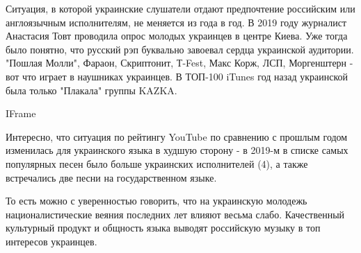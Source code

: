 Ситуация, в которой украинские слушатели отдают предпочтение российским
или англоязычным исполнителям, не меняется из года в год. В 2019 году
журналист Анастасия Товт проводила опрос молодых украинцев в центре Киева.
Уже тогда было понятно, что русский рэп буквально завоевал сердца
украинской аудитории. "Пошлая Молли", Фараон, Скриптонит, Т-Fest, Макс
Корж, ЛСП, Моргенштерн - вот что играет в наушниках украинцев. В ТОП-100
iTunes год назад украинской была только "Плакала" группы KAZKA.

IFrame

Интересно, что ситуация по рейтингу YouTube по сравнению с прошлым годом
изменилась для украинского языка в худшую сторону - в 2019-м в списке самых
популярных песен было больше украинских исполнителей (4), а также встречались
две песни на государственном языке. 

То есть можно с уверенностью говорить, что на украинскую молодежь
националистические веяния последних лет влияют весьма слабо. Качественный
культурный продукт и общность языка выводят российскую музыку в топ интересов
украинцев. 


